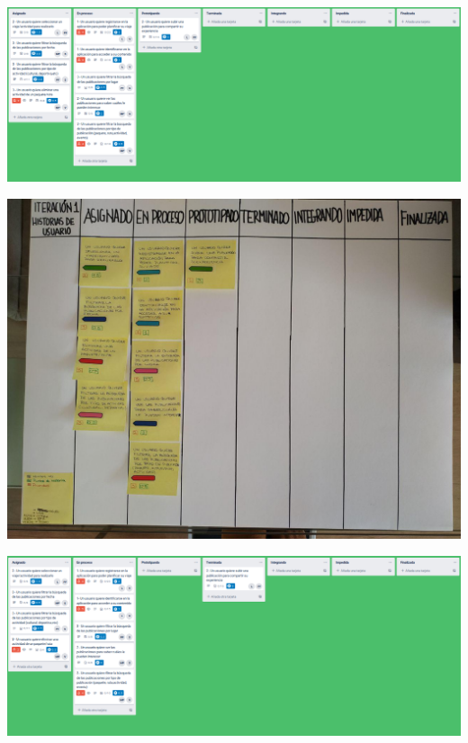 \documentclass[spanish]{beamer}
\begin{document}
\begin{frame}
	\begin{center}
		\includegraphics[scale=0.24]{trello1_3}
	\end{center}
\end{frame}

\begin{frame}
	\begin{center}
		\includegraphics[angle=180, scale=0.32]{papel1_3}
	\end{center}
\end{frame}

\begin{frame}
	\begin{center}
		\includegraphics[scale=0.24]{trello1_4}
	\end{center}
\end{frame}
\end{document}

